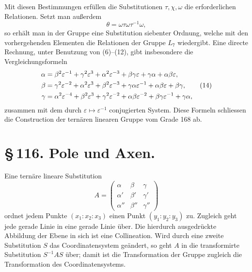 \documentclass[11pt]{article}
\newcommand{\eps}{\varepsilon}
\newcommand{\mat}[1]{\begin{pmatrix}#1\end{pmatrix}}
\begin{document}
Mit diesen Bestimmungen erfüllen die Substitutionen \(\tau,\chi,\omega\) die erforderlichen Relationen. Setzt man außerdem
\begin{equation}
\theta=\omega\tau\omega\tau^{-1}\omega,
\tag{13}
\end{equation}
so erhält man in der Gruppe eine Substitution siebenter Ordnung, welche mit den vorhergehenden Elementen die Relationen der Gruppe \(L_7\) wiedergibt. Eine directe Rechnung, unter Benutzung von (6)--(12), gibt insbesondere die Vergleichungsformeln
\begin{align}
\alpha&=\beta^2\eps^{-1}+\gamma^2\eps^3+\alpha^2\eps^{-3}+\beta\gamma\eps+\gamma\alpha+\alpha\beta\eps,\notag\\
\beta&=\gamma^2\eps^{-2}+\alpha^2\eps^3+\beta^2\eps^{-3}+\gamma\alpha\eps^{-1}+\alpha\beta\eps+\beta\gamma,\tag{14}\\
\gamma&=\alpha^2\eps^{-4}+\beta^2\eps^3+\gamma^2\eps^{-2}+\alpha\beta\eps^{-2}+\beta\gamma\eps^{-1}+\gamma\alpha,\notag
\end{align}
zusammen mit dem durch \(\eps\mapsto\eps^{-1}\) conjugierten System. Diese Formeln schliessen die Construction der ternären linearen Gruppe vom Grade 168 ab.

\section*{\S\,116. Pole und Axen.}

Eine ternäre lineare Substitution
\begin{equation}
A=\mat{\alpha&\beta&\gamma\\\alpha'&\beta'&\gamma'\\\alpha''&\beta''&\gamma''}
\tag{1}
\end{equation}
ordnet jedem Punkte \((x_1:x_2:x_3)\) einen Punkt \((y_1:y_2:y_3)\) zu. Zugleich geht jede gerade Linie in eine gerade Linie über. Die hierdurch ausgedrückte Abbildung der Ebene in sich ist eine Collineation. Wird durch eine zweite Substitution \(S\) das Coordinatensystem geändert, so geht \(A\) in die transformirte Substitution \(S^{-1}AS\) über; damit ist die Transformation der Gruppe zugleich die Transformation des Coordinatensystems.
\end{document}
